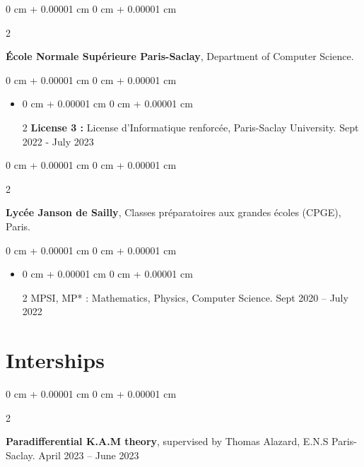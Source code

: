 \documentclass[10pt, letterpaper]{article}
\newenvironment{highlights}{
    \begin{itemize}[
        topsep=0.10 cm,
        parsep=0.10 cm,
        partopsep=0pt,
        itemsep=0pt,
        leftmargin=0 cm + 10pt
    ]
}{
    \end{itemize}
} %
\newenvironment{onecolentry}{
    \begin{adjustwidth}{
        0 cm + 0.00001 cm
    }{
        0 cm + 0.00001 cm
    }
}{
    \end{adjustwidth}
} %
\newenvironment{twocolentry}[2][]{
    \onecolentry
    \def\secondColumn{#2}
    \setcolumnwidth{\fill, 4.5 cm}
    \begin{paracol}{2}
}{
    \switchcolumn \raggedleft \secondColumn
    \end{paracol}
    \endonecolentry
} %
\begin{document}
       
        \begin{twocolentry}{
        }
            \textbf{École Normale Supérieure Paris-Saclay}, Department of Computer Science. \end{twocolentry}
        \vspace{0.10 cm}
        \begin{onecolentry}
            \begin{highlights}
                \item \begin{twocolentry}{Sept 2022 - July 2023}\textbf{License 3 :} License d'Informatique renforcée, Paris-Saclay University. \end{twocolentry} 
            \end{highlights}
        \end{onecolentry}
        
        
        \vspace{0.2cm}        
        
        
        \begin{twocolentry}{
        }
            \textbf{Lycée Janson de Sailly}, Classes préparatoires aux grandes écoles (CPGE), Paris. \end{twocolentry}
        \vspace{0.10 cm}
        \begin{onecolentry}
            \begin{highlights}
                \item \begin{twocolentry}{Sept 2020 – July 2022} MPSI, MP* : Mathematics, Physics, Computer Science.\end{twocolentry}
            \end{highlights}
        \end{onecolentry}
        
        

		
		\vspace{0.2cm}
		


    
    \section{Interships}



        \begin{twocolentry}{
            April 2023 – June 2023
        }
            \textbf{Paradifferential K.A.M theory}, supervised by Thomas Alazard, E.N.S Paris-Saclay. \end{twocolentry}
\end{document}
